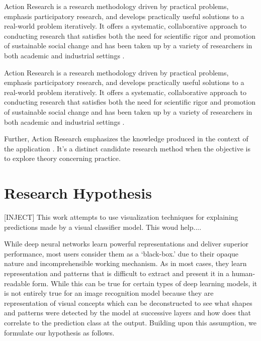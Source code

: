 Action Research is a research methodology driven by practical problems, emphasis participatory research, and develops practically useful solutions to a real-world problem iteratively. It offers a systematic, collaborative approach to conducting research that satisfies both the need for scientific rigor and promotion of sustainable social change and has been taken up by a variety of researchers in both academic and industrial settings \cite{Hayes:2011:RAR:1993060.1993065}.

Action Research is a research methodology driven by practical problems, emphasis participatory research, and develops practically useful solutions to a real-world problem iteratively. It offers a systematic, collaborative approach to conducting research that satisfies both the need for scientific rigor and promotion of sustainable social change and has been taken up by a variety of researchers in both academic and industrial settings \cite{Hayes:2011:RAR:1993060.1993065}.

Further, Action Research emphasizes the knowledge produced in the context of the application \cite{401014119781201}. It’s a distinct candidate research method when the objective is to explore theory concerning practice.

\section{Research Hypothesis}

[INJECT] This work attempts to use visualization techniques for explaining predictions made by a visual classifier model. This woud help....

While deep neural networks learn powerful representations and deliver superior performance, most users consider them as a ‘black-box.’ due to their opaque nature and incomprehensible working mechanism. As in most cases, they learn representation and patterns that is difficult to extract and present it in a human-readable form. While this can be true for certain types of deep learning models, it is not entirely true for an image recognition model because they are representation of visual concepts which can be deconstructed to see what shapes and patterns were detected by the model at successive layers \cite{Zeiler} and how does that correlate to the prediction class at the output. Building upon this assumption, we formulate our hypothesis as follows.

